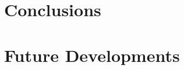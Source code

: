 \documentclass[../main.tex]{subfiles}
\begin{document}
\section{Conclusions}
\section{Future Developments}
\cleardoublepage
\end{document}
